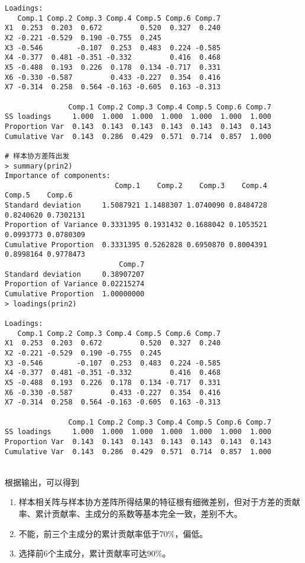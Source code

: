 \begin{enumerate}
\begin{lstlisting}
Loadings:
   Comp.1 Comp.2 Comp.3 Comp.4 Comp.5 Comp.6 Comp.7
X1  0.253  0.203  0.672         0.520  0.327  0.240
X2 -0.221 -0.529  0.190 -0.755  0.245              
X3 -0.546        -0.107  0.253  0.483  0.224 -0.585
X4 -0.377  0.481 -0.351 -0.332         0.416  0.468
X5 -0.488  0.193  0.226  0.178  0.134 -0.717  0.331
X6 -0.330 -0.587         0.433 -0.227  0.354  0.416
X7 -0.314  0.258  0.564 -0.163 -0.605  0.163 -0.313

               Comp.1 Comp.2 Comp.3 Comp.4 Comp.5 Comp.6 Comp.7
SS loadings     1.000  1.000  1.000  1.000  1.000  1.000  1.000
Proportion Var  0.143  0.143  0.143  0.143  0.143  0.143  0.143
Cumulative Var  0.143  0.286  0.429  0.571  0.714  0.857  1.000

# 样本协方差阵出发
> summary(prin2)
Importance of components:
                          Comp.1    Comp.2    Comp.3    Comp.4    Comp.5    Comp.6
Standard deviation     1.5087921 1.1488307 1.0740090 0.8484728 0.8240620 0.7302131
Proportion of Variance 0.3331395 0.1931432 0.1688042 0.1053521 0.0993773 0.0780309
Cumulative Proportion  0.3331395 0.5262828 0.6950870 0.8004391 0.8998164 0.9778473
                           Comp.7
Standard deviation     0.38907207
Proportion of Variance 0.02215274
Cumulative Proportion  1.00000000
> loadings(prin2)

Loadings:
   Comp.1 Comp.2 Comp.3 Comp.4 Comp.5 Comp.6 Comp.7
X1  0.253  0.203  0.672         0.520  0.327  0.240
X2 -0.221 -0.529  0.190 -0.755  0.245              
X3 -0.546        -0.107  0.253  0.483  0.224 -0.585
X4 -0.377  0.481 -0.351 -0.332         0.416  0.468
X5 -0.488  0.193  0.226  0.178  0.134 -0.717  0.331
X6 -0.330 -0.587         0.433 -0.227  0.354  0.416
X7 -0.314  0.258  0.564 -0.163 -0.605  0.163 -0.313

               Comp.1 Comp.2 Comp.3 Comp.4 Comp.5 Comp.6 Comp.7
SS loadings     1.000  1.000  1.000  1.000  1.000  1.000  1.000
Proportion Var  0.143  0.143  0.143  0.143  0.143  0.143  0.143
Cumulative Var  0.143  0.286  0.429  0.571  0.714  0.857  1.000
\end{lstlisting}
        \summary\\
        根据输出，可以得到
        \begin{enumerate}[label=(\arabic*)]
            \item 样本相关阵与样本协方差阵所得结果的特征根有细微差别，但对于方差的贡献率、累计贡献率、主成分的系数等基本完全一致，差别不大。
            \item 不能，前三个主成分的累计贡献率低于70\%，偏低。
            \item 选择前6个主成分，累计贡献率可达90\%。
        \end{enumerate}
    \end{enumerate}
\clearpage
